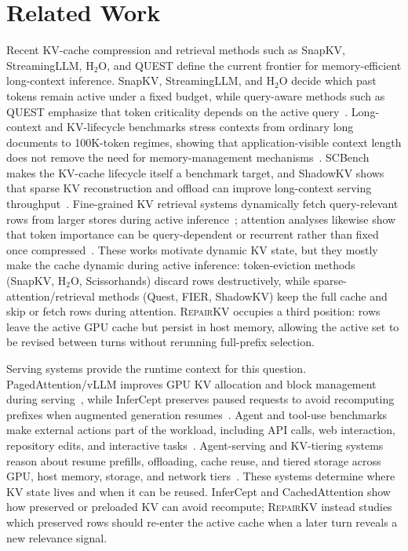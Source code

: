 \documentclass{article}
\newcommand{\repairkv}{\textsc{RepairKV}}
\begin{document}
\section{Related Work}
\label{sec:related}

Recent KV-cache compression and retrieval methods such as SnapKV,
StreamingLLM, H$_2$O, and QUEST define the current frontier for
memory-efficient long-context inference.
SnapKV, StreamingLLM, and H$_2$O decide which past tokens remain active
under a fixed budget, while query-aware methods such as QUEST emphasize
that token criticality depends on the active
query~\citep{snapkv,streamingllm,h2o,quest}.
Long-context and KV-lifecycle benchmarks stress contexts from ordinary
long documents to 100K-token regimes, showing that
application-visible context length does not remove the need for
memory-management mechanisms~\citep{longbench,inftybench,ruler,scbench}.
SCBench makes the KV-cache lifecycle itself a benchmark target, and
ShadowKV shows that sparse KV reconstruction and offload can improve
long-context serving throughput~\citep{scbench,shadowkv}.
Fine-grained KV retrieval systems dynamically fetch query-relevant rows
from larger stores during active inference~\citep{quest,fier,pariskv};
attention analyses likewise show that token importance can be
query-dependent or recurrent rather than fixed once
compressed~\citep{retrieval_heads,lazy_eviction}.
These works motivate dynamic KV state, but they mostly make the cache 
dynamic during active inference: token-eviction methods
(SnapKV, H$_2$O, Scissorhands) discard rows destructively, while
sparse-attention/retrieval methods (Quest, FIER, ShadowKV) keep the
full cache and skip or fetch rows during attention. \repairkv{} occupies
a third position: rows leave the active GPU cache but persist in host
memory, allowing the active set to be revised between turns without rerunning
full-prefix selection.

Serving systems provide the runtime context for this question.
PagedAttention/vLLM improves GPU KV allocation and block management during
serving~\citep{vllm}, while InferCept preserves paused requests to avoid
recomputing prefixes when augmented generation resumes~\citep{infercept}.
Agent and tool-use benchmarks make external actions part of the workload,
including API calls, web interaction, repository edits, and interactive
tasks~\citep{toollm,webarena,swebench,agentbench}.
Agent-serving and KV-tiering systems reason about resume prefills,
offloading, cache reuse, and tiered storage across GPU, host memory,
storage, and network tiers~\citep{continuum,agentserve,lmcache,ttkv,cachedattention}.
These systems determine where KV state lives and when it can be reused.
InferCept and CachedAttention show how preserved or preloaded KV can avoid
recompute; \repairkv{} instead studies which preserved rows should re-enter
the active cache when a later turn reveals a new relevance signal.
\end{document}
